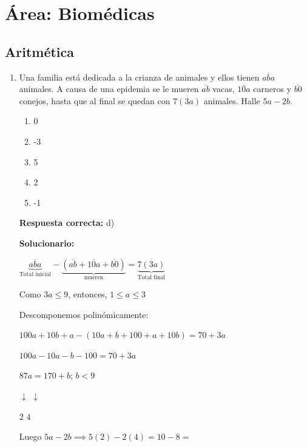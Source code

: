 \section*{Área: Biomédicas}


\subsection*{Aritmética}

\begin{enumerate}

	\item Una familia está dedicada a la crianza de animales y ellos tienen $\overline{aba}$ animales. A causa de una epidemia se le mueren $\overline{ab}$ vacas, $\overline{10a}$ carneros y $\overline{b0}$ conejos, hasta que al final se quedan con $\overline{7(3a)}$ animales. Halle $5a-2b$.
	\begin{enumerate}[label=\alph*)]
		\item 0
		\item -3
		\item 5
		\item 2
		\item -1
	\end{enumerate}
	\textbf{Respuesta correcta:} d)

	\vspace{2mm}
	\textbf{Solucionario:}


	$\underbrace{\overline{aba}}_{\text{Total inicial}} - \underbrace{(\overline{ab} + \overline{10a} + \overline{b0})}_{\text{mueren}} = \underbrace{\overline{7(3a)}}_{\text{Total final}}$

	Como $3a \le 9$, entonces, $1 \le a \le 3$

	Descomponemos polinómicamente:

	$100a + 10b + a - (10a + b + 100 + a + 10b) = 70 + 3a$

	$100a - 10a - b - 100 = 70 + 3a$

	$87a = 170 + b$; $b < 9$

	$\downarrow$ \hspace{6mm} $\downarrow$

	$2$ \hspace{7.5mm} $4$

	Luego $5a - 2b \implies 5(2) - 2(4) = 10 - 8 =$

	\vspace{6mm}


\end{enumerate}
